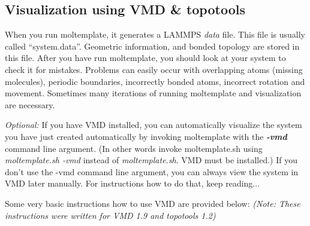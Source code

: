 \documentclass[11pt]{article}
\begin{document}

\subsection{Visualization using VMD \& topotools}
\label{sec:vmd_topotools}

When you run moltemplate, it generates a LAMMPS \textit{data} file. 
This file is usually called ``system.data''.
Geometric information, and bonded topology are stored in this file.
After you have run moltemplate, you should look at your system 
to check it for mistakes. 
Problems can easily occur with overlapping atoms (missing molecules), 
periodic boundaries, incorrectly bonded atoms, incorrect rotation and movement.
Sometimes many iterations of running moltemplate and 
visualization are necessary.  

\textit{Optional:}
If you have VMD installed, you can automatically visualize the system
you have just created automatically by invoking moltemplate with 
the \textit{\textbf{-vmd}} command line argument.
(In other words invoke moltemplate.sh using \textit{moltemplate.sh -vmd}
 instead of \textit{moltemplate.sh}.  VMD must be installed.)
If you don't use the -vmd command line argument, you can always view the 
system in VMD later manually.  For instructions how to do that, 
keep reading...

Some very basic instructions how to use VMD are provided below:
\textit{(Note: These instructions were written for VMD 1.9 and topotools 1.2)}
\end{document}

